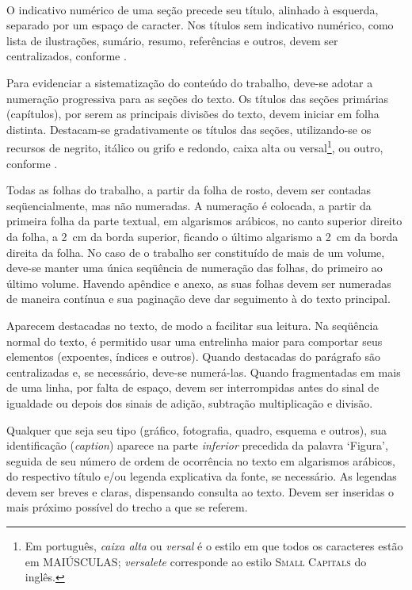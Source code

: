 \documentclass[espaco=simples,appendix=Name]{abnt}
\newcommand{\descrtype}{descriptionbf}
\renewenvironment{description}%
  {\expandafter\csname\descrtype\endcsname\edef\enddescrtype{end\descrtype}}
  {\expandafter\csname\enddescrtype\endcsname}
\newcommand{\ingles}[1]{\textsl{#1}}
\begin{document}
{\begin{description}
\item[Numeração das seções] \ \\
  \cite[5.3.2]{NBR14724:2001} O indicativo
  numérico de uma seção precede seu título, alinhado à esquerda, separado
  por um espaço de caracter. Nos títulos sem indicativo numérico, como
  lista de ilustrações, sumário, resumo, referências e outros, devem ser
  centralizados, conforme \cite{NBR6024:1989}.

  \cite[5.5]{NBR14724:2001} Para evidenciar a sistematização do conteúdo
  do trabalho, deve-se adotar a numeração progressiva para as seções do
  texto. Os títulos das seções primárias (capítulos), por serem as
  principais divisões do texto, devem iniciar em folha
  distinta. Destacam-se gradativamente os títulos das seções, utilizando-se
  os recursos de negrito, itálico ou grifo e redondo, caixa alta ou
  versal\footnote{Em português, \textsl{caixa alta} ou \textsl{versal} é o
    estilo em que todos os caracteres estão em MAIÚSCULAS;
    \textsl{versalete} corresponde ao estilo \textsc{Small Capitals} do
    inglês.}, ou outro, conforme \cite{NBR6024:1989}.

\item[Paginação] \cite[5.4]{NBR14724:2001} Todas as folhas do trabalho,
  a partir da folha de rosto, devem ser contadas seqüencialmente, mas não
  numeradas. A numeração é colocada, a partir da primeira folha da parte
  textual, em algarismos arábicos, no canto superior direito da folha, a
  2~cm da borda superior, ficando o último algarismo a 2~cm da borda
  direita da folha. No caso de o trabalho ser constituído de mais de um
  volume, deve-se manter uma única seqüência de numeração das folhas, do
  primeiro ao último volume. Havendo apêndice e anexo, as suas folhas devem
  ser numeradas de maneira contínua e sua paginação deve dar seguimento à
  do texto principal. 

\item[Equações e fórmulas] \cite[5.8]{NBR14724:2001} Aparecem destacadas
  no texto, de modo a facilitar sua leitura. Na seqüência normal do texto,
  é permitido usar uma entrelinha maior para comportar seus elementos
  (expoentes, índices e outros). Quando destacadas do parágrafo são
  centralizadas e, se necessário, deve-se numerá-las. Quando fragmentadas
  em mais de uma linha, por falta de espaço, devem ser interrompidas antes
  do sinal de igualdade ou depois dos sinais de adição, subtração
  multiplicação e divisão.
  
\item[Figuras] \cite[5.9.1]{NBR14724:2001} Qualquer que seja seu tipo
  (gráfico, fotografia, quadro, esquema e outros), sua identificação
  (\ingles{caption}) aparece na parte \emph{inferior} precedida da palavra
  `Figura', seguida de seu número de ordem de ocorrência no texto em
  algarismos arábicos, do respectivo título e/ou legenda explicativa da
  fonte, se necessário. As legendas devem ser breves e claras, dispensando
  consulta ao texto. Devem ser inseridas o mais próximo possível do trecho
  a que se referem.
  

\end{description}}
\end{document}
